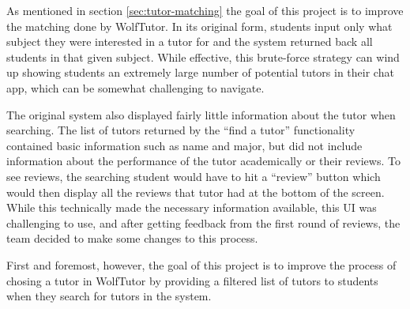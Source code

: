 As mentioned in section \ref{sec:tutor-matching} the goal of this project is to
improve the matching done by WolfTutor.  In its original form, students input
only what subject they were interested in a tutor for and the system returned
back all students in that given subject.  While effective, this brute-force
strategy can wind up showing students an extremely large number of potential
tutors in their chat app, which can be somewhat challenging to navigate.

The original system also displayed fairly little information about the tutor
when searching.  The list of tutors returned by the ``find a tutor''
functionality contained basic information such as name and major, but did not
include information about the performance of the tutor academically or their
reviews.  To see reviews, the searching student would have to hit a ``review''
button which would then display all the reviews that tutor had at the bottom of
the screen. While this technically made the necessary information available,
this UI was challenging to use, and after getting feedback from the first round
of reviews, the team decided to make some changes to this process.  

First and foremost, however, the goal of this project is to improve the process
of chosing a tutor in WolfTutor by providing a filtered list of tutors to
students when they search for tutors in the system.  
